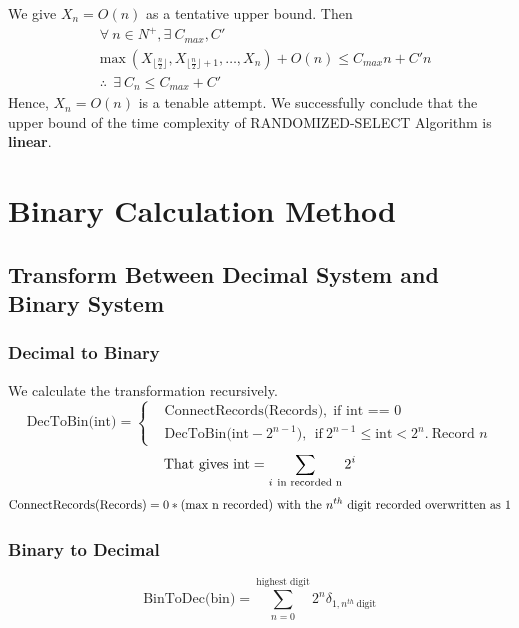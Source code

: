 \documentclass[15pt]{article}
\begin{document}
We give $X_n = O(n)$ as a tentative upper bound. Then
\begin{equation}
\begin{aligned}
    &\forall~n\in N^{+}, \exists~ C_{max}, C' \\ &\text{max}~(X_{\lfloor \frac{n}{2} \rfloor}, X_{\lfloor \frac{n}{2} \rfloor + 1}, \dots, X_n) + O(n) \leq C_{max}n + C'n \\
    & \therefore~~\exists~ C_n \leq C_{max} + C'
\end{aligned}
\end{equation}
Hence, $X_n = O(n)$ is a tenable attempt. We successfully conclude that the upper bound of the time complexity of RANDOMIZED-SELECT Algorithm is \textbf{linear}.
\section{Binary Calculation Method}
\subsection{Transform Between Decimal System and Binary System}
\subsubsection{Decimal to Binary}
We calculate the transformation recursively.
\begin{equation}
\text{DecToBin(int)}=\left\{
\begin{aligned}
    & \text{ConnectRecords(Records)},~~\text{if int == 0 } \\
    & \text{DecToBin(int}  - 2^{n-1}),~~\text{if}~2^{n-1} \leq \text{int} < 2^{n}.~\text{Record $n$}
\end{aligned}
\right. 
\end{equation}
\begin{equation}
    \text{That gives}~ \text{int} = \sum \limits_{i~\text{in recorded n}}2^i \notag
\end{equation}
\begin{equation}
\begin{aligned}
    \text{ConnectRecords(Records)} =0*(\text{max n recorded}) ~\text{with the $n^{th}$ digit recorded overwritten as 1} \notag
\end{aligned}
\end{equation}
\subsubsection{Binary to Decimal}
\begin{equation}
    \text{BinToDec(bin)} =\sum_{n=0}^{\text{highest digit}} 2^{n} \delta_{1, n^{th}~\text{digit}}
\end{equation}
\end{document}
